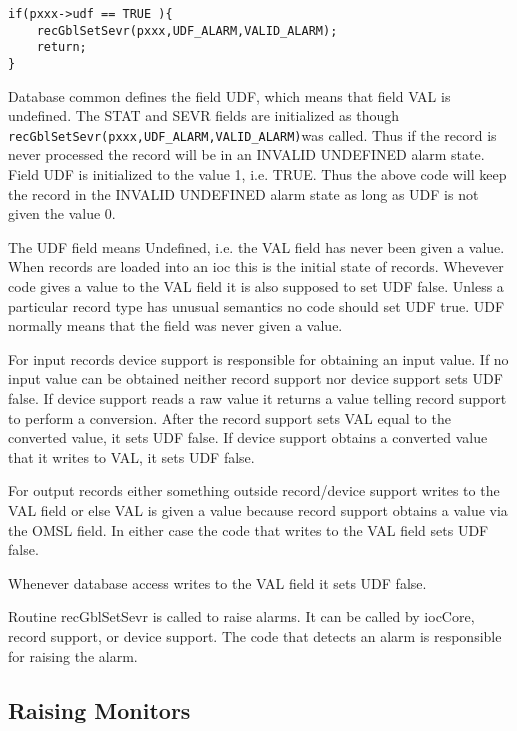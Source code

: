 \begin{verbatim}
if(pxxx->udf == TRUE ){
    recGblSetSevr(pxxx,UDF_ALARM,VALID_ALARM);
    return;
}
\end{verbatim}Database common defines the field UDF, which means that field VAL is undefined. The STAT and SEVR fields are 
initialized as though \verb|recGblSetSevr(pxxx,UDF_ALARM,VALID_ALARM)|was called. Thus if the record is never 
processed the record will be in an INVALID UNDEFINED alarm state. Field UDF is initialized to the value 1, i.e. TRUE. 
Thus the above code will keep the record in the INVALID UNDEFINED alarm state as long as UDF is not given the 
value 0.

The UDF field means Undefined, i.e. the VAL field has never been given a value. When records are loaded into an ioc this 
is the initial state of records. Whevever code gives a value to the VAL field it is also supposed to set UDF false. Unless a 
particular record type has unusual semantics no code should set UDF true. UDF normally means that the field was never 
given a value.

For input records device support is responsible for obtaining an input value. If no input value can be obtained neither 
record support nor device support sets UDF false. If device support reads a raw value it returns a value telling record 
support to perform a conversion. After the record support sets VAL equal to the converted value, it sets UDF false. If 
device support obtains a converted value that it writes to VAL, it sets UDF false.

For output records either something outside record/device support writes to the VAL field or else VAL is given a value 
because record support obtains a value via the OMSL field. In either case the code that writes to the VAL field sets UDF 
false.

Whenever database access writes to the VAL field it sets UDF false.

Routine recGblSetSevr is called to raise alarms. It can be called by iocCore, record support, or device support. The code 
that detects an alarm is responsible for raising the alarm.

\subsection{Raising Monitors}

